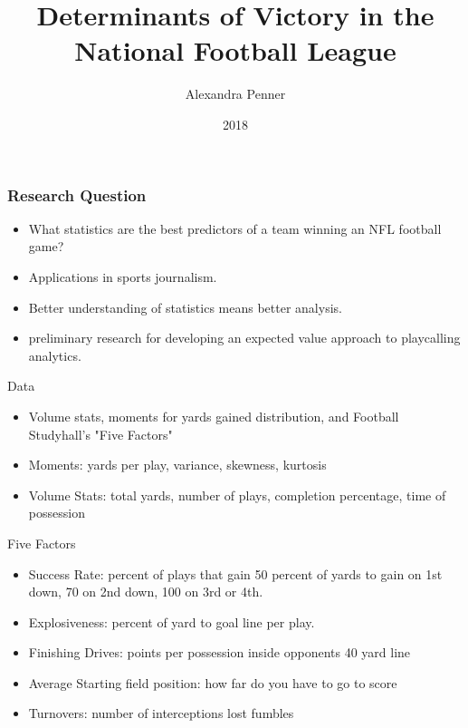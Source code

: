 \documentclass{beamer}
\title{Determinants of Victory in the National Football League}
\author{Alexandra Penner}
\institute{University of Oklahoma}
\date{2018}
\begin{document}
 
\frame{\titlepage}
 
\begin{frame}
\frametitle{Research Question}
\begin{itemize}
    \item What statistics are the best predictors of a team winning an NFL football game?

    \item Applications in sports journalism.

    \item Better understanding of statistics means better analysis. 

    \item preliminary research for developing an expected value approach to playcalling analytics.
\end{itemize}
\end{frame}

\begin{frame}{Data}
\begin{itemize}
    \item Volume stats, moments for yards gained distribution, and Football Studyhall's "Five Factors"

    \item Moments: yards per play, variance, skewness, kurtosis 

    \item Volume Stats: total yards, number of plays, completion percentage,  time of possession 
\end{itemize}
\end{frame}
 
\begin{frame}{Five Factors}
\begin{itemize}
    \item Success Rate: percent of plays that gain 50 percent of yards to gain on 1st down, 70 on 2nd down, 100 on 3rd or 4th.

    \item Explosiveness: percent of yard to goal line per play.

    \item Finishing Drives: points per possession inside opponents 40 yard line

    \item Average Starting field position: how far do you have to go to score

    \item Turnovers: number of interceptions lost fumbles
\end{itemize}    
\end{frame} 
 
\end{document}
